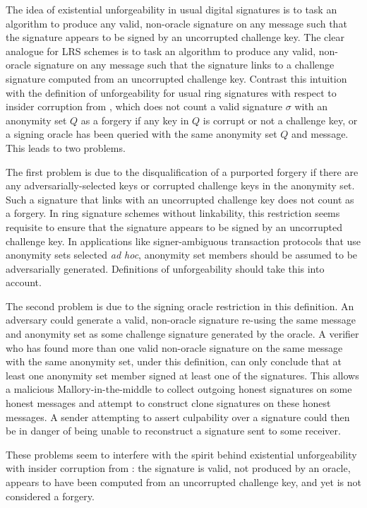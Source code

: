 \documentclass{llncs}
\begin{document}
The idea of existential unforgeability in usual digital signatures is to task an algorithm to produce any valid, non-oracle signature on any message such that the signature appears to be signed by an uncorrupted challenge key. The clear analogue for LRS schemes is to task an algorithm to produce any valid, non-oracle signature on any message such that the signature links to a challenge signature computed from an uncorrupted challenge key.  Contrast this intuition with the definition of unforgeability for usual ring signatures with respect to insider corruption from \cite{bender2006ring}, which does not count a valid signature $\sigma$ with an anonymity set $Q$ as a forgery if any key in $Q$ is corrupt or not a challenge key, or a signing oracle has been queried with the same anonymity set $Q$ and message. This leads to two problems.

The first problem is due to the disqualification of a purported forgery if there are any adversarially-selected keys or corrupted challenge keys in the anonymity set. Such a signature that links with an uncorrupted challenge key does not count as a forgery. In ring signature schemes without linkability, this restriction seems requisite to ensure that the signature appears to be signed by an uncorrupted challenge key. In applications like signer-ambiguous transaction protocols that use anonymity sets selected \textit{ad hoc}, anonymity set members should be assumed to be adversarially generated. Definitions of unforgeability should take this into account.

The second problem is due to the signing oracle restriction in this definition. An adversary could generate a valid, non-oracle signature re-using the same message and anonymity set as some challenge signature generated by the oracle. A verifier who has found more than one valid non-oracle signature on the same message with the same anonymity set, under this definition, can only conclude that at least one anonymity set member signed at least one of the signatures. This allows a malicious Mallory-in-the-middle to collect outgoing honest signatures on some honest messages and attempt to construct clone signatures on these honest messages. A sender attempting to assert culpability over a signature could then be in danger of being unable to reconstruct a signature sent to some receiver.

These problems seem to interfere with the spirit behind existential unforgeability with insider corruption from \cite{bender2006ring}: the signature is valid, not produced by an oracle, appears to have been computed from an uncorrupted challenge key, and yet is not considered a forgery.
\end{document}
